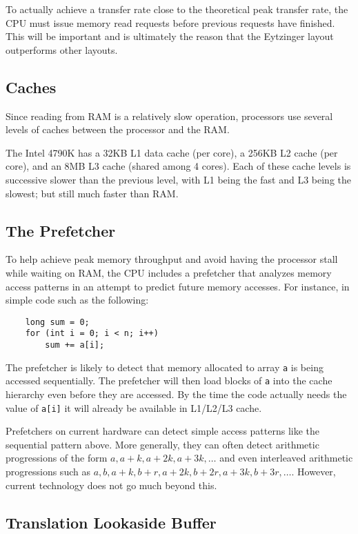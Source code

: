 \documentclass{patmorin}
\begin{document}
To actually achieve a transfer rate close to the theoretical peak transfer
rate, the CPU must issue memory read requests before previous requests
have finished. This will be important and is ultimately the reason that
the Eytzinger layout outperforms other layouts.

\subsection{Caches}

Since reading from RAM is a relatively slow operation, processors use
several levels of caches between the processor and the RAM.

The Intel 4790K has a 32KB L1 data cache (per core), a 256KB L2 cache
(per core), and an 8MB L3 cache (shared among 4 cores).  Each of these
cache levels is successive slower than the previous level, with L1 being
the fast and L3 being the slowest; but still much faster than RAM.

\subsection{The Prefetcher}

To help achieve peak memory throughput and avoid having the processor
stall while waiting on RAM, the CPU includes a prefetcher that analyzes
memory access patterns in an attempt to predict future memory accesses.
For instance, in simple code such as the following:

\begin{verbatim}
    long sum = 0;
    for (int i = 0; i < n; i++) 
        sum += a[i];
\end{verbatim}

The prefetcher is likely to detect that memory allocated to array
\texttt{a} is being accessed sequentially.  The prefetcher will
then load blocks of \texttt{a} into the cache hierarchy even
before they are accessed.  By the time the code actually needs the value
of \texttt{a[i]} it will already be available in L1/L2/L3 cache.

Prefetchers on current hardware can detect simple access patterns
like the sequential pattern above.  More generally, they can often
detect arithmetic progressions of the form $a,a+k,a+2k,a+3k,\ldots$
and even interleaved arithmetic progressions such as $a, b, a+k, b+r,
a+2k,b+2r,a+3k,b+3r,\ldots$.  However, current technology does not go
much beyond this.

\subsection{Translation Lookaside Buffer}
\end{document}
